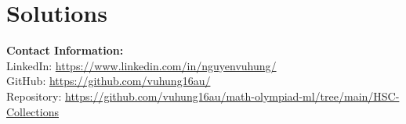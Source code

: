\documentclass[12pt]{article}
\begin{document}


\section{Solutions}






































\vspace{2em}
\noindent
\textbf{Contact Information:}\\[0.5em]
LinkedIn: \href{https://www.linkedin.com/in/nguyenvuhung/}{https://www.linkedin.com/in/nguyenvuhung/}\\[0.3em]
GitHub: \href{https://github.com/vuhung16au/}{https://github.com/vuhung16au/}\\[0.3em]
Repository: \href{https://github.com/vuhung16au/math-olympiad-ml/tree/main/HSC-Collections}{https://github.com/vuhung16au/math-olympiad-ml/tree/main/HSC-Collections}
\end{document}
